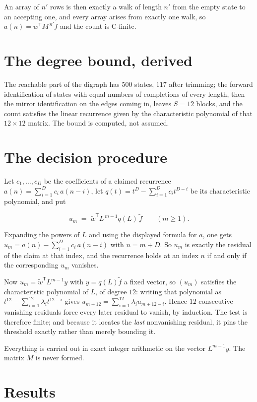 \documentclass[11pt]{article}
\theoremstyle{definition}
\begin{document}
An array of $n'$ rows is then exactly a walk of length $n'$ from the empty state to an accepting one, and every array arises from exactly one walk, so $a(n) = w^{\mathsf T}M^{\,n'}f$ and the count is C-finite.

\section{The degree bound, derived}

The reachable part of the digraph has $500$ states, $117$ after trimming; the forward identification of states with equal numbers of completions of every length, then the mirror identification on the edges coming in, leaves $S = 12$ blocks, and the count satisfies the linear recurrence given by the characteristic polynomial of that $12\times12$ matrix. The bound is computed, not assumed.

\section{The decision procedure}

Let $c_1,\dots,c_D$ be the coefficients of a claimed recurrence $a(n) = \sum_{i=1}^{D} c_i\,a(n-i)$, let $q(t) = t^{D} - \sum_{i=1}^{D} c_i t^{D-i}$ be its characteristic polynomial, and put

\[u_m \;=\; \tilde w^{\mathsf T} L^{\,m-1} q(L)\,\tilde f \qquad (m \ge 1).\]

Expanding the powers of $L$ and using the displayed formula for $a$, one gets $u_m = a(n) - \sum_{i=1}^{D} c_i\,a(n-i)$ with $n = m + D$. So $u_m$ is exactly the residual of the claim at that index, and the recurrence holds at an index $n$ if and only if the corresponding $u_m$ vanishes.

Now $u_m = \tilde w^{\mathsf T} L^{m-1} y$ with $y = q(L)\tilde f$ a fixed vector, so $(u_m)$ satisfies the characteristic polynomial of $L$, of degree $12$: writing that polynomial as $t^{12} - \sum_{i=1}^{12} \lambda_i t^{12-i}$ gives $u_{m+12} = \sum_{i=1}^{12} \lambda_i u_{m+12-i}$. Hence $12$ consecutive vanishing residuals force every later residual to vanish, by induction. The test is therefore finite; and because it locates the {\itshape last} nonvanishing residual, it pins the threshold exactly rather than merely bounding it.

Everything is carried out in exact integer arithmetic on the vector $L^{m-1}y$. The matrix $M$ is never formed.

\section{Results}
\end{document}
